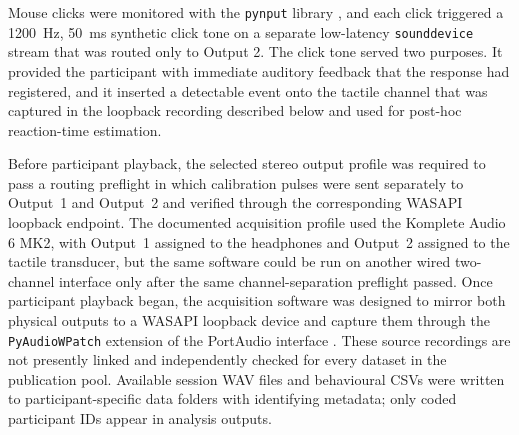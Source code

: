 Mouse clicks were monitored with the \texttt{pynput} library \citep{pynput_python}, and each click triggered a 1200~Hz, 50~ms synthetic click tone on a separate low-latency \texttt{sounddevice} stream that was routed only to Output 2. The click tone served two purposes. It provided the participant with immediate auditory feedback that the response had registered, and it inserted a detectable event onto the tactile channel that was captured in the loopback recording described below and used for post-hoc reaction-time estimation.

Before participant playback, the selected stereo output profile was required to pass a routing preflight in which calibration pulses were sent separately to Output~1 and Output~2 and verified through the corresponding WASAPI loopback endpoint. The documented acquisition profile used the Komplete Audio 6 MK2, with Output~1 assigned to the headphones and Output~2 assigned to the tactile transducer, but the same software could be run on another wired two-channel interface only after the same channel-separation preflight passed. Once participant playback began, the acquisition software was designed to mirror both physical outputs to a WASAPI loopback device and capture them through the \texttt{PyAudioWPatch} extension of the PortAudio interface \citep{pyaudiowpatch}. These source recordings are not presently linked and independently checked for every dataset in the publication pool. Available session WAV files and behavioural CSVs were written to participant-specific data folders with identifying metadata; only coded participant IDs appear in analysis outputs.

